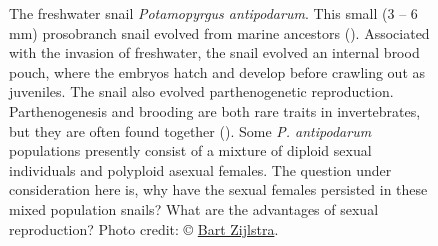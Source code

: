 \documentclass[
  letterpaper,
]{book}
\begin{document}
\begin{figure}


\caption[The freshwater snail \emph{Potamopyrgus
antipodarum}]{\label{fig-3-4}The freshwater snail \emph{Potamopyrgus
antipodarum}. This small (3 -- 6 mm) prosobranch snail evolved from
marine ancestors (). Associated with the invasion of freshwater, the snail evolved an
internal brood pouch, where the embryos hatch and develop before
crawling out as juveniles. The snail also evolved parthenogenetic
reproduction. Parthenogenesis and brooding are both rare traits in
invertebrates, but they are often found together
(). Some \emph{P.
antipodarum} populations presently consist of a mixture of diploid
sexual individuals and polyploid asexual females. The question under
consideration here is, why have the sexual females persisted in these
mixed population snails? What are the advantages of sexual reproduction?
Photo credit: © \href{https://www.bartzijlstra.com}{Bart Zijlstra}.}

\end{figure}%
\end{document}
